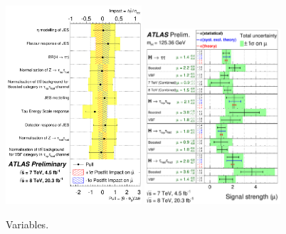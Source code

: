 \begin{figure}[tp]
  \centering
  \includegraphics[width=0.45\textwidth]{figures/ATLAS-CONF-2014-061/fig_07}
  \includegraphics[width=0.45\textwidth]{figures/ATLAS-CONF-2014-061/fig_09}
  \caption{Variables.}
  \label{fig:results-mup0}
\end{figure}


